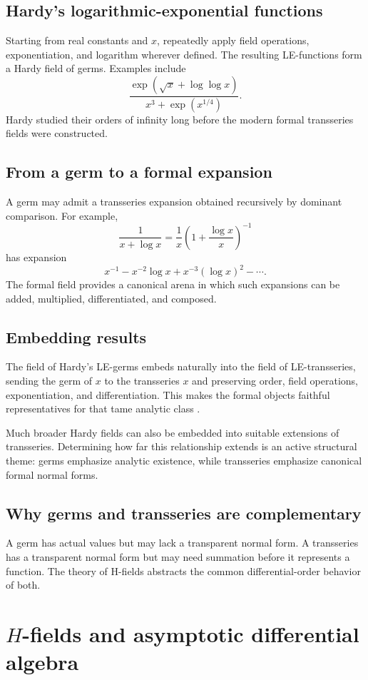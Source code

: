 \documentclass[11pt,openany]{book}
\theoremstyle{plain}
\theoremstyle{definition}
\theoremstyle{remark}
\begin{document}
\section{Hardy's logarithmic-exponential functions}
Starting from real constants and $x$, repeatedly apply field operations, exponentiation, and logarithm wherever defined. The resulting LE-functions form a Hardy field of germs. Examples include
\[
  \frac{\exp(\sqrt{x}+\log\log x)}
  {x^3+\exp(x^{1/4})}.
\]
Hardy studied their orders of infinity long before the modern formal transseries fields were constructed.

\section{From a germ to a formal expansion}
A germ may admit a transseries expansion obtained recursively by dominant comparison. For example,
\[
  \frac1{x+\log x}
  =\frac1x\left(1+\frac{\log x}{x}\right)^{-1}
\]
has expansion
\[
  x^{-1}-x^{-2}\log x+x^{-3}(\log x)^2-\cdots.
\]
The formal field provides a canonical arena in which such expansions can be added, multiplied, differentiated, and composed.

\section{Embedding results}
The field of Hardy's LE-germs embeds naturally into the field of LE-transseries, sending the germ of $x$ to the transseries $x$ and preserving order, field operations, exponentiation, and differentiation. This makes the formal objects faithful representatives for that tame analytic class \cite{DMM1997,DMM2001,ADH2018}.

Much broader Hardy fields can also be embedded into suitable extensions of transseries. Determining how far this relationship extends is an active structural theme: germs emphasize analytic existence, while transseries emphasize canonical formal normal forms.

\section{Why germs and transseries are complementary}
A germ has actual values but may lack a transparent normal form. A transseries has a transparent normal form but may need summation before it represents a function. The theory of H-fields abstracts the common differential-order behavior of both.

\chapter{\texorpdfstring{$H$}{H}-fields and asymptotic differential algebra}
\label{chap:hfields}
\end{document}
